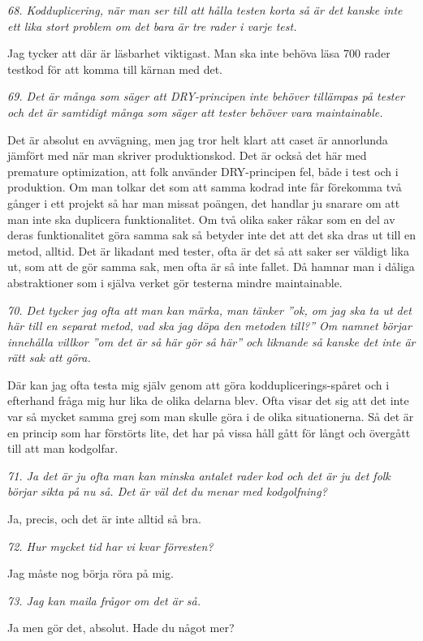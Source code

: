\documentclass[11pt]{article}
\begin{document}
\emph{68. Kodduplicering, när man ser till att hålla testen korta så är det kanske inte ett lika stort problem om det bara är tre rader i varje test.}

Jag tycker att där är läsbarhet viktigast. Man ska inte behöva läsa 700 rader testkod för att komma till kärnan med det.

\emph{69. Det är många som säger att DRY-principen inte behöver tillämpas på tester och det är samtidigt många som säger att tester behöver vara maintainable.}

Det är absolut en avvägning, men jag tror helt klart att caset är annorlunda jämfört med när man skriver produktionskod. Det är också det här med premature optimization, att folk använder DRY-principen fel, både i test och i produktion. Om man tolkar det som att samma kodrad inte får förekomma två gånger i ett projekt så har man missat poängen, det handlar ju snarare om att man inte ska duplicera funktionalitet. Om två olika saker råkar som en del av deras funktionalitet göra samma sak så betyder inte det att det ska dras ut till en metod, alltid. Det är likadant med tester, ofta är det så att saker ser väldigt lika ut, som att de gör samma sak, men ofta är så inte fallet. Då hamnar man i dåliga abstraktioner som i själva verket gör testerna mindre maintainable.

\emph{70. Det tycker jag ofta att man kan märka, man tänker ”ok, om jag ska ta ut det här till en separat metod, vad ska jag döpa den metoden till?” Om namnet börjar innehålla villkor ”om det är så här gör så här” och liknande så kanske det inte är rätt sak att göra.}

Där kan jag ofta testa mig själv genom att göra kodduplicerings-spåret och i efterhand fråga mig hur lika de olika delarna blev. Ofta visar det sig att det inte var så mycket samma grej som man skulle göra i de olika situationerna. Så det är en princip som har förstörts lite, det har på vissa håll gått för långt och övergått till att man kodgolfar.

\emph{71. Ja det är ju ofta man kan minska antalet rader kod och det är ju det folk börjar sikta på nu så. Det är väl det du menar med kodgolfning?}

Ja, precis, och det är inte alltid så bra.

\emph{72. Hur mycket tid har vi kvar förresten?}

Jag måste nog börja röra på mig.

\emph{73. Jag kan maila frågor om det är så.}

Ja men gör det, absolut. Hade du något mer?
\end{document}
